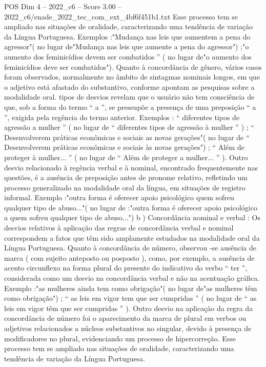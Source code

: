 \begin{textsample}{POS Dim 4 – 2022\_c6 – Score 3.00 – 2022\_c6/enade\_2022\_tec\_com\_ext\_4bf6f451b1.txt}
Esse processo tem se ampliado nas situações de oralidade, caracterizando uma tendência de variação da Língua Portuguesa.
Exemplos :"Mudança nas leis que aumentem a pena do agressor"( no lugar de"Mudança nas leis que aumente a pena do agressor") ;"o aumento dos feminicídios devem ser combatidos ” ( no lugar de"o aumento dos feminicídios deve ser combatidos").
Quanto à concordância de gênero, vários casos foram observados, normalmente no âmbito de sintagmas nominais longos, em que o adjetivo está afastado do substantivo, conforme apontam as pesquisas sobre a modalidade oral. tipos de desvios revelam que o usuário não tem consciência de que, sob a forma do termo “ a ”, se pressupõe a presença de uma preposição “ a ”, exigida pela regência do termo anterior.
Exemplos : “ diferentes tipos de agressão a mulher ” ( no lugar de “ diferentes tipos de agressão à mulher ” ) ; “ Desenvolverem práticas econômicas e sociais as novas gerações"( no lugar de “ Desenvolverem práticas econômicas e sociais às novas gerações") ; “ Além de proteger à mulher... ” ( no lugar de “ Além de proteger a mulher... ” ).
Outro desvio relacionado à regência verbal e à nominal, encontrado frequentemente nas questões, é a ausência de preposição antes de pronome relativo, refletindo um processo generalizado na modalidade oral da língua, em situações de registro informal.
Exemplo :"outra forma é oferecer apoio psicológico quem sofreu qualquer tipo de abuso..."( no lugar de :"outra forma é oferecer apoio psicológico a quem sofreu qualquer tipo de abuso...") b ) Concordância nominal e verbal : Os desvios relativos à aplicação das regras de concordância verbal e nominal correspondem a fatos que têm sido amplamente estudados na modalidade oral da Língua Portuguesa.
Quanto à concordância de número, observou -se ausência de marca ( com sujeito anteposto ou posposto ), como, por exemplo, a ausência de acento circunflexo na forma plural do presente do indicativo do verbo “ ter ”, considerada como um desvio na concordância verbal e não na acentuação gráfica.
Exemplo :"as mulheres ainda tem como obrigação"( no lugar de"as mulheres têm como obrigação") ; “ as leis em vigor tem que ser cumpridas ” ( no lugar de “ as leis em vigor têm que ser cumpridas ” ).
Outro desvio na aplicação da regra da concordância de número foi o aparecimento da marca de plural em verbos ou adjetivos relacionados a núcleos substantivos no singular, devido à presença de modificadores no plural, evidenciando um processo de hipercorreção.
Esse processo tem se ampliado nas situações de oralidade, caracterizando uma tendência de variação da Língua Portuguesa.

\end{textsample}
